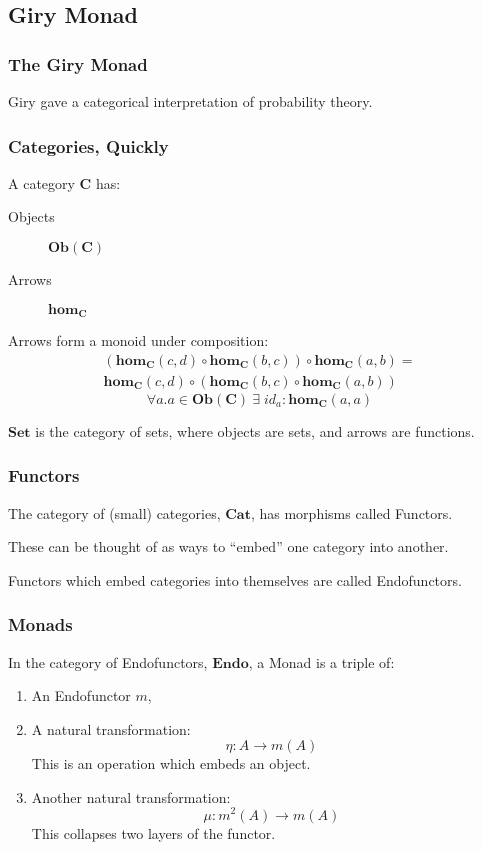 \documentclass[usenames,dvipsnames]{beamer}
\begin{document}
\subsection{Giry Monad}
\begin{frame}
  \frametitle{The Giry Monad}
  Giry gave a categorical interpretation of
  probability theory.
\end{frame}
\begin{frame}
  \frametitle{Categories, Quickly}
  A category $\mathbf{C}$ has:
  \pause
  \begin{description}
    \item[Objects] $\mathbf{Ob}(\mathbf{C})$
    \pause
    \item[Arrows] $\mathbf{hom}_{\mathbf{C}}$
  \end{description}
  \pause
  Arrows form a monoid under composition:
  \begin{multline}
    (\mathbf{hom}_{\mathbf{C}}(c,d) \circ \mathbf{hom}_{\mathbf{C}}(b,c)) \circ \mathbf{hom}_{\mathbf{C}}(a,b) = \\
    \mathbf{hom}_{\mathbf{C}}(c,d) \circ (\mathbf{hom}_{\mathbf{C}}(b,c) \circ \mathbf{hom}_{\mathbf{C}}(a,b))
  \end{multline}
  \begin{equation}
    \forall a. a \in \mathbf{Ob}(\mathbf{C}) \: \exists \; \mathit{id}_a : \mathbf{hom}_{\mathbf{C}}(a, a)
  \end{equation}
  \pause

  $\mathbf{Set}$ is the category of sets, where objects are sets, and arrows
  are functions.
\end{frame}
\begin{frame}
  \frametitle{Functors}
  The category of (small) categories, $\mathbf{Cat}$, has morphisms called
  Functors.
  \pause

  These can be thought of as ways to ``embed'' one category into another.
  \pause

  Functors which embed categories into themselves are called Endofunctors.
\end{frame}
\begin{frame}
  \frametitle{Monads}
  In the category of Endofunctors, $\mathbf{Endo}$, a Monad is a triple of:
  \begin{enumerate}
    \item An Endofunctor $\mathit{m}$,
    \item A natural transformation:
      \begin{equation}
        \eta : A \rightarrow \mathit{m}(A)
      \end{equation}
      This is an operation which embeds an object.
    \item Another natural transformation:
      \begin{equation}
        \mu : \mathit{m}^2(A) \rightarrow \mathit{m}(A)
      \end{equation}
      This collapses two layers of the functor.
  \end{enumerate}
\end{frame}
\end{document}
